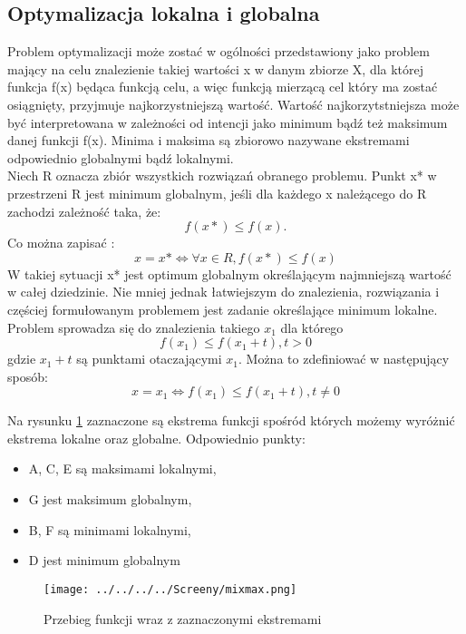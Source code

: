 \subsection{Optymalizacja lokalna i globalna}

Problem optymalizacji może zostać w ogólności przedstawiony jako problem mający na celu znalezienie takiej wartości x w danym zbiorze X, dla której funkcja f(x) będąca funkcją celu, a więc funkcją mierzącą cel który ma zostać osiągnięty, przyjmuje najkorzystniejszą wartość. Wartość najkorzytstniejsza może być interpretowana w zależności od intencji jako minimum bądź też maksimum danej funkcji f(x). Minima i maksima są zbiorowo nazywane ekstremami odpowiednio globalnymi bądź lokalnymi.\\

Niech R oznacza zbiór wszystkich rozwiązań obranego problemu. Punkt x* w przestrzeni R jest minimum globalnym, jeśli dla każdego x należącego do R zachodzi zależność taka, że:
$$
 f(x*) \le f(x).
$$
Co można zapisać :
$$
x = x*   \Leftrightarrow   \forall x \in R,    f(x*)\le f(x)
$$
W takiej sytuacji x* jest optimum globalnym określającym najmniejszą wartość w całej dziedzinie. Nie mniej jednak łatwiejszym do znalezienia, rozwiązania i częściej formułowanym problemem jest zadanie określające minimum lokalne. Problem sprowadza się do znalezienia takiego $x_{1} $ dla którego 
$$
f(x_{1}) \le f(x_{1} + t), t >0
$$
gdzie $x_{1} + t $ są punktami otaczającymi $x_{1}$.
Można to zdefiniować w następujący sposób:
$$
x = x_{1} \Leftrightarrow f(x_{1}) \le f(x_{1} + t), t \ne 0
$$

Na rysunku \ref{minmax} zaznaczone są ekstrema funkcji spośród których możemy wyróżnić ekstrema lokalne oraz globalne. Odpowiednio punkty:\\

\begin{itemize}
\item A, C, E są maksimami lokalnymi,
\item G jest maksimum globalnym,
\item B, F są minimami lokalnymi,
\item D jest minimum globalnym
\end{itemize}

\begin{figure}[h!]
\begin{center}
		\texttt{[image: ../../../../Screeny/mixmax.png]}
		\caption{Przebieg funkcji wraz z zaznaczonymi ekstremami}
		\label{minmax}		
\end{center}	
\end{figure}


